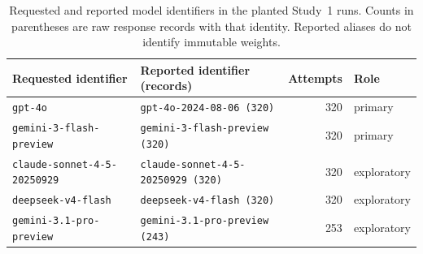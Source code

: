 \begin{table}[t]\centering\scriptsize\setlength{\tabcolsep}{3pt}
\caption{Requested and reported model identifiers in the planted Study~1 runs. Counts in parentheses are raw response records with that identity. Reported aliases do not identify immutable weights.}\label{tab:model-identities}
\begin{tabular}{@{}p{}p{}rl@{}}
\toprule
Requested identifier & Reported identifier (records) & Attempts & Role \\\midrule
\texttt{gpt-4o} & \texttt{gpt-4o-2024-08-06 (320)} & 320 & primary \\
\texttt{gemini-3-flash-preview} & \texttt{gemini-3-flash-preview (320)} & 320 & primary \\
\texttt{claude-sonnet-4-5-20250929} & \texttt{claude-sonnet-4-5-20250929 (320)} & 320 & exploratory \\
\texttt{deepseek-v4-flash} & \texttt{deepseek-v4-flash (320)} & 320 & exploratory \\
\texttt{gemini-3.1-pro-preview} & \texttt{gemini-3.1-pro-preview (243)} & 253 & exploratory \\
\bottomrule
\end{tabular}\end{table}
